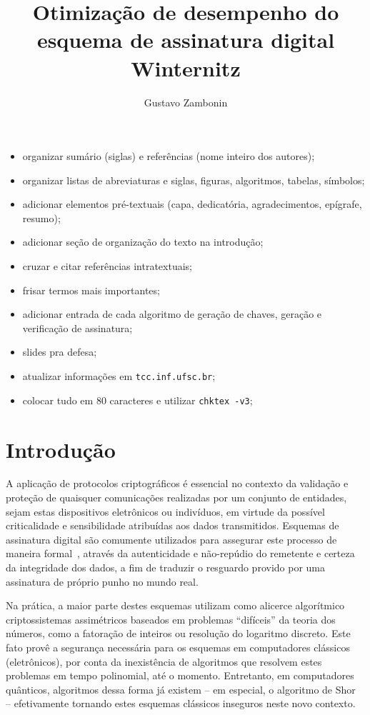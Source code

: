 \documentclass[12pt]{report}
\title{
  Otimização de desempenho do esquema de assinatura digital Winternitz
}
\author{Gustavo Zambonin}
\date{}
\begin{document}
\maketitle

\tableofcontents

\newpage

{\Huge
\begin{itemize}
    \item organizar sumário (siglas) e referências (nome inteiro dos autores);
    \item organizar listas de abreviaturas e siglas, figuras, algoritmos, tabelas, símbolos;
    \item adicionar elementos pré-textuais (capa, dedicatória, agradecimentos, epígrafe, resumo);
    \item adicionar seção de organização do texto na introdução;
    \item cruzar e citar referências intratextuais;
    \item frisar termos mais importantes;
    \item adicionar entrada de cada algoritmo de geração de chaves, geração e verificação de assinatura;
    \item slides pra defesa;
    \item atualizar informações em \texttt{tcc.inf.ufsc.br};
    \item colocar tudo em 80 caracteres e utilizar \texttt{chktex -v3};
\end{itemize}
}

\newpage

\chapter{Introdução}

A aplicação de protocolos criptográficos é essencial no contexto da validação e
proteção de quaisquer comunicações realizadas por um conjunto de entidades,
sejam estas dispositivos eletrônicos ou indivíduos, em virtude da possível
criticalidade e sensibilidade atribuídas aos dados transmitidos. Esquemas de
assinatura digital são comumente utilizados para assegurar este processo de
maneira formal~\cite{Goldreich:2004:FCV:975541}, através da autenticidade e
não-repúdio do remetente e certeza da integridade dos dados, a fim de traduzir
o resguardo provido por uma assinatura de próprio punho no mundo real.

Na prática, a maior parte destes esquemas utilizam como alicerce algorítmico
criptossistemas assimétricos baseados em problemas ``difíceis'' da teoria dos
números, como a fatoração de inteiros ou resolução do logaritmo discreto.
Este fato provê a segurança necessária para os esquemas
em computadores clássicos (eletrônicos), por conta da inexistência de
algoritmos que resolvem estes problemas em tempo polinomial, até o momento.
Entretanto, em computadores quânticos, algoritmos dessa forma já existem -- em
especial, o algoritmo de Shor~\cite{Shor:1997:PAP:264393.264406} --
efetivamente tornando estes esquemas clássicos inseguros neste novo contexto.
\end{document}
